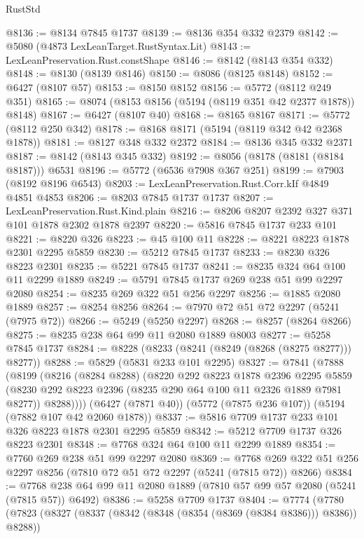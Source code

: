 \begin{lexlean}{RustStd}
\begin{coremodule}
{\begin{coremodule}
{{{{{{{{{{{{{{{{{{{{{{{{{{{{{@8136 := @8134 @7845 @1737
@8139 := @8136 @354 @332 @2379
@8142 := @5080 (@4873 LexLeanTarget.RustSyntax.Lit)
@8143 := LexLeanPreservation.Rust.constShape
@8146 := @8142 (@8143 @354 @332)
@8148 := @8130 (@8139 @8146)
@8150 := @8086 (@8125 @8148)
@8152 := @6427 (@8107 @57)
@8153 := @8150 @8152
@8156 := @5772 (@8112 @249 @351)
@8165 := @8074 (@8153 @8156 (@5194 (@8119 @351 @42 @2377 @1878)) @8148)
@8167 := @6427 (@8107 @40)
@8168 := @8165 @8167
@8171 := @5772 (@8112 @250 @342)
@8178 := @8168 @8171 (@5194 (@8119 @342 @42 @2368 @1878))
@8181 := @8127 @348 @332 @2372
@8184 := @8136 @345 @332 @2371
@8187 := @8142 (@8143 @345 @332)
@8192 := @8056 (@8178 (@8181 (@8184 @8187))) @6531
@8196 := @5772 (@6536 @7908 @367 @251)
@8199 := @7903 (@8192 @8196 @6543)
@8203 := LexLeanPreservation.Rust.Corr.kIf @4849 @4851 @4853
@8206 := @8203 @7845 @1737 @1737
@8207 := LexLeanPreservation.Rust.Kind.plain
@8216 := @8206 @8207 @2392 @327 @371 @101 @1878 @2302 @1878 @2397
@8220 := @5816 @7845 @1737 @233 @101
@8221 := @8220 @326
@8223 := @45 @100 @11
@8228 := @8221 @8223 @1878 @2301 @2295 @5859
@8230 := @5212 @7845 @1737
@8233 := @8230 @326 @8223 @2301
@8235 := @5221 @7845 @1737
@8241 := @8235 @324 @64 @100 @11 @2299 @1889
@8249 := @5791 @7845 @1737 @269 @238 @51 @99 @2297 @2080
@8254 := @8235 @269 @322 @51 @256 @2297
@8256 := @1885 @2080 @1889
@8257 := @8254 @8256
@8264 := @7970 @72 @51 @72 @2297 (@5241 (@7975 @72))
@8266 := @5249 (@5250 @2297)
@8268 := @8257 (@8264 @8266)
@8275 := @8235 @238 @64 @99 @11 @2080 @1889 @8003
@8277 := @5258 @7845 @1737
@8284 := @8228 (@8233 (@8241 (@8249 (@8268 (@8275 @8277))) @8277))
@8288 := @5829 (@5831 @233 @101 @2295)
@8327 := @7841
    (@7888
      (@8199
        (@8216
          (@8284 @8288)
          (@8220
            @292
            @8223
            @1878
            @2396
            @2295
            @5859
            (@8230 @292 @8223 @2396 (@8235 @290 @64 @100 @11 @2326 @1889 @7981 @8277))
            @8288))))
    (@6427 (@7871 @40))
    (@5772 (@7875 @236 @107))
    (@5194 (@7882 @107 @42 @2060 @1878))
@8337 := @5816 @7709 @1737 @233 @101 @326 @8223 @1878 @2301 @2295 @5859
@8342 := @5212 @7709 @1737 @326 @8223 @2301
@8348 := @7768 @324 @64 @100 @11 @2299 @1889
@8354 := @7760 @269 @238 @51 @99 @2297 @2080
@8369 := @7768 @269 @322 @51 @256 @2297 @8256 (@7810 @72 @51 @72 @2297 (@5241 (@7815 @72)) @8266)
@8384 := @7768 @238 @64 @99 @11 @2080 @1889 (@7810 @57 @99 @57 @2080 (@5241 (@7815 @57)) @6492)
@8386 := @5258 @7709 @1737
@8404 := @7774
    (@7780
      (@7823
        (@8327 (@8337 (@8342 (@8348 (@8354 (@8369 (@8384 @8386))) @8386)) @8288))
}}}}}}}}}}}}}}}}}}}}}}}}}}}}}
\end{coremodule}}
\end{coremodule}
\end{lexlean}
